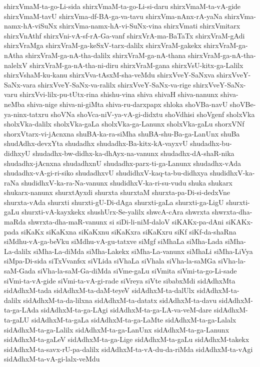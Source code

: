 {shirxVmaM-ta-go-Li-sida
shirxVmaM-ta-go-Li-si-daru
shirxVmaM-ta-vA-gide
shirxVmaM-tavU
shirxVma-df-BA-ga-va-tavu
shirxVma-nAnx-rA-yaNa
shirxVma-namx-hA-viSuNx
shirxVma-namx-hA-vi-SuNx-vina
shirxVmati
shirxVmitarx
shirxVnAthf
shirxVni-vA-sf-rA-Ga-vanf
shirxVrA-ma-BaTaTx
shirxVraM-gAdi
shirxVraMga
shirxVraM-ga-keSxV-tarx-dalilx
shirxVraM-gakekx
shirxVraM-ga-nAtha
shirxVraM-ga-nA-tha-dalilx
shirxVraM-ga-nA-thana
shirxVraM-ga-nA-tha-nalelxV
shirxVraM-ga-nA-tha-ni-diru
shirxVraM-gana
shirxVsU-kitx-ga-Lalilx
shirxVshaM-ku-kanu
shirxVva-tAsxM-sha-veMdu
shirxVveY-SaNxva
shirxVveY-SaNx-vara
shirxVveY-SaNx-va-ralilx
shirxVveY-SaNx-va-rige
shirxVveY-SaNx-varu
shirxVvi-lilx-pu-tUtx-rina
shishu-vina
shiva
shivaH
shiva-nanunx
shiva-neMba
shiva-nige
shiva-ni-giMta
shiva-ru-darxpapx
shloka
shoVBa-navU
shoVBe-ya-ninx-tatxru
shoVNa
shoVca-niV-ya-vA-gi-didxtu
shoVdhisi
shoVgenf
sholxVka
sholxVka-dalilx
sholxVka-gaLa
sholxVka-ga-Lanunx
sholxVka-gaLu
shorxVNf
shorxVtarx-vi-jAcnxna
shuBA-ka-ra-siMha
shuBA-shu-Ba-ga-LanUnx
shuBa
shudAdhx-devxYta
shudadhx
shudadhx-Ba-kitx-kA-vayxvU
shudadhx-bu-didhxyU
shudadhx-bw-didhx-ka-dhAyx-na-vanunx
shudadhx-dA-shaR-nika
shudadhx-jAcnxna
shudadhxnU
shudadhx-parx-ti-ga-Lanunx
shudadhx-vAda
shudadhx-vA-gi-ri-siko
shudadhxvU
shudidhxV-kaq-ta-bu-didhxya
shudidhxV-ka-raNa
shudidhxV-ka-ra-Na-vanunx
shudidhxV-ka-ri-su-vudu
shuka
shukarx
shukarx-nanunx
shurxtAyxdi
shurxta
shurxtaM
shurxta-pa-Di-si-dedxVne
shurxta-vAda
shurxti
shurxti-gU-Di-dAga
shurxti-gaLa
shurxti-ga-LigU
shurxti-gaLu
shurxti-vA-kayxkekx
shushUrx-Se-yalilx
shwcA-cAra
shwrxta
shwrxta-dha-maRda
shwrxta-dha-maR-vanunx
si
siDi-li-niM-daloV
siKAKx-pa-dAni
siKAKx-pada
siKaKx
siKaKxna
siKaKxnu
siKaKxra
siKaKxru
siKf
siKf-da-shaRna
siMdhu-vA-ga-beVku
siMdhu-vA-gu-tatxve
siMgf
siMhaLa
siMha-Lada
siMha-La-dalilx
siMha-La-diMda
siMha-Lakekx
siMha-La-vanunx
siMhaLi
siMha-LiVya
siMpa-Di-sida
siTxVvanfsx
siVLida
siVhaLa
siVhala
siVha-la-saMGa
siVha-la-saM-Gada
siVha-la-saM-Ga-diMda
siVme-gaLu
siVmita
siVmi-ta-go-Li-sade
siVmi-ta-vA-gide
siVmi-ta-vA-gi-rade
siVreya
siVte
sibabxMdi
sidAdhxMta
sidAdhxM-tada
sidAdhxM-ta-daM-teyeV
sidAdhxM-ta-dalUlx
sidAdhxM-ta-dalilx
sidAdhxM-ta-da-lilxna
sidAdhxM-ta-datatx
sidAdhxM-ta-davu
sidAdhxM-ta-ga-LAda
sidAdhxM-ta-ga-LAgi
sidAdhxM-ta-ga-LA-va-veM-dare
sidAdhxM-ta-gaLU
sidAdhxM-ta-gaLa
sidAdhxM-ta-ga-LaMte
sidAdhxM-ta-ga-Lalalx
sidAdhxM-ta-ga-Lalilx
sidAdhxM-ta-ga-LanUnx
sidAdhxM-ta-ga-Lanunx
sidAdhxM-ta-gaLeV
sidAdhxM-ta-ga-Lige
sidAdhxM-ta-gaLu
sidAdhxM-takekx
sidAdhxM-ta-savx-rU-pa-dalilx
sidAdhxM-ta-vA-du-da-riMda
sidAdhxM-ta-vAgi
sidAdhxM-ta-vA-gi-lalx-veMdu
}
